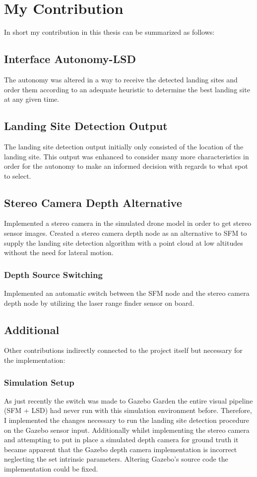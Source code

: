 \chapter{My Contribution}

In short my contribution in this thesis can be summarized as follows:

\section{Interface Autonomy-LSD}
The autonomy was altered in a way to receive the detected landing sites and order them according to an adequate heuristic to determine the best landing site at any given time.
\section{Landing Site Detection Output}
The landing site detection output initially only consisted of the location of the landing site. This output was enhanced to consider many more characteristics in order for the autonomy to make an informed decision with regards to what spot to select.
\section{Stereo Camera Depth Alternative}
Implemented a stereo camera in the simulated drone model in order to get stereo sensor images. Created a stereo camera depth node as an alternative to SFM to supply the landing site detection algorithm with a point cloud at low altitudes without the need for lateral motion. 
\subsection{Depth Source Switching}
Implemented an automatic switch between the SFM node and the stereo camera depth node by utilizing the laser range finder sensor on board.
\section{Additional}
Other contributions indirectly connected to the project itself but necessary for the implementation:
\subsection{Simulation Setup}
As just recently the switch was made to Gazebo Garden the entire visual pipeline (SFM + LSD) had never run with this simulation environment before. Therefore, I implemented the changes necessary to run the landing site detection procedure on the Gazebo sensor input. Additionally whilst implementing the stereo camera and attempting to put in place a simulated depth camera for ground truth it became apparent that the Gazebo depth camera implementation is incorrect neglecting the set intrinsic parameters. Altering Gazebo's source code the implementation could be fixed.
